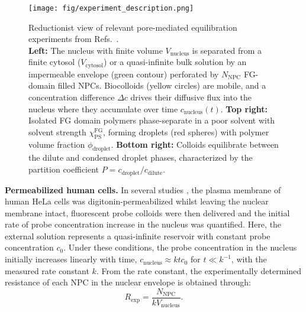 \documentclass[10pt, a4paper, twocolumn]{article}
\begin{document}
\begin{figure}[]
    \centering
    \texttt{[image: fig/experiment\_description.png]}
    \caption{Reductionist view of relevant pore-mediated equilibration experiments from Refs.~\cite{Ribbeck2001, Mohr2009, Popken2015, Timney2016, Frey2018}.\\
    \textbf{Left:} The nucleus with finite volume $V_\text{nucleus}$ is separated from a finite cytosol ($V_\text{cytosol}$) or a quasi-infinite bulk solution by an impermeable envelope (green contour) perforated by $N_\text{NPC}$ FG-domain filled NPCs. 
    Biocolloids (yellow circles) are mobile, and a concentration difference $\Delta c$ drives their diffusive flux into the nucleus where they accumulate over time $c_\text{nucleus}(t)$.
    \textbf{Top right:} Isolated FG domain polymers phase-separate in a poor solvent with solvent strength $\chi_{\text{PS}}^{\text{FG}}$, forming droplets (red spheres) with polymer volume fraction $\phi_{\text{droplet}}$.
    \textbf{Bottom right:} Colloids equilibrate between the dilute and condensed droplet phases, characterized by the partition coefficient $P = c_\text{droplet}/c_\text{dilute}$.
    }
    \label{fig:experiments_overview}
\end{figure}

\bigskip\noindent
\textbf{Permeabilized human cells.}
In several studies \cite{Ribbeck2001, Mohr2009, Frey2018}, the plasma membrane of human HeLa cells was digitonin-permeabilized whilst leaving the nuclear membrane intact, fluorescent probe colloids were then delivered and the initial rate of probe concentration increase in the nucleus was quantified.
Here, the external solution represents a quasi-infinite reservoir with constant probe concentration $c_0$.
Under these conditions, the probe concentration in the nucleus initially increases linearly with time, $c_\text{nucleus} \approx k t c_0$ for $t \ll k^{-1}$, with the measured rate constant $k$.
From the rate constant, the experimentally determined resistance of each NPC in the nuclear envelope is obtained through: 
\begin{equation}
    R_\text{exp} = \frac{N_\text{NPC}}{k V_\text{nucleus}}.
    \label{eq:Exp_Resistance_1}
\end{equation}
\end{document}
